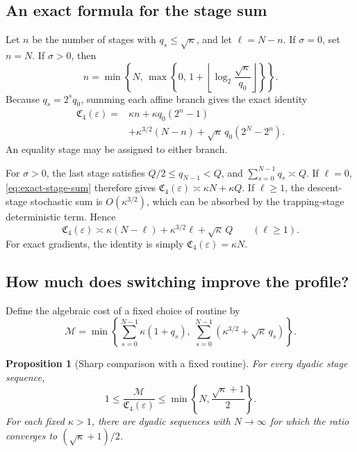 \documentclass[11pt,a4paper]{article}
\newcommand{\eps}{\varepsilon}
\newcommand{\profile}{\mathfrak C_4}
\newtheorem{proposition}[theorem]{Proposition}
\theoremstyle{definition}
\theoremstyle{remark}
\begin{document}
\subsection{An exact formula for the stage sum}

Let $n$ be the number of stages with $q_s\le\sqrt\kappa$, and let
$\ell=N-n$.  If $\sigma=0$, set $n=N$.  If $\sigma>0$, then
\[
 n=\min\!\left\{N,\,
       \max\!\left\{0,\,
       1+\left\lfloor\log_2\frac{\sqrt\kappa}{q_0}\right\rfloor
       \right\}\right\}.
\]
Because $q_s=2^s q_0$, summing each affine branch gives the exact
identity
\begin{equation}
\begin{split}
 \profile(\eps)
 ={}&\kappa n+\kappa q_0(2^n-1)\\
    &+\kappa^{3/2}(N-n)
       +\sqrt\kappa\,q_0(2^N-2^n).
\end{split}
\label{eq:exact-stage-sum}
\end{equation}
An equality stage may be assigned to either branch.

For $\sigma>0$, the last stage satisfies
$Q/2\le q_{N-1}<Q$, and
$\sum_{s=0}^{N-1}q_s\asymp Q$.
If $\ell=0$, \eqref{eq:exact-stage-sum} therefore gives
$\profile(\eps)\asymp\kappa N+\kappa Q$.
If $\ell\ge1$, the descent-stage stochastic sum is
$O(\kappa^{3/2})$, which can be absorbed by the trapping-stage
deterministic term.  Hence
\begin{equation}
 \profile(\eps)\asymp
 \kappa(N-\ell)+\kappa^{3/2}\ell+\sqrt\kappa\,Q
 \qquad(\ell\ge1).
 \label{eq:stage-sum-asymptotic}
\end{equation}
For exact gradients, the identity is simply
$\profile(\eps)=\kappa N$.

\subsection{How much does switching improve the profile?}

Define the algebraic cost of a fixed choice of routine by
\begin{equation}
 \mathcal M
 =\min\!\left\{
       \sum_{s=0}^{N-1}\kappa(1+q_s),\
       \sum_{s=0}^{N-1}(\kappa^{3/2}+\sqrt\kappa\,q_s)
       \right\}.
 \label{eq:fixed-routine-profile}
\end{equation}

\begin{proposition}[Sharp comparison with a fixed routine]
\label{prop:sharp-switching}
For every dyadic stage sequence,
\begin{equation}
 1\le\frac{\mathcal M}{\profile(\eps)}
 \le\min\!\left\{N,\frac{\sqrt\kappa+1}{2}\right\}.
 \label{eq:switching-gain}
\end{equation}
For each fixed $\kappa>1$, there are dyadic sequences with
$N\to\infty$ for which the ratio converges to
$(\sqrt\kappa+1)/2$.
\end{proposition}
\end{document}
